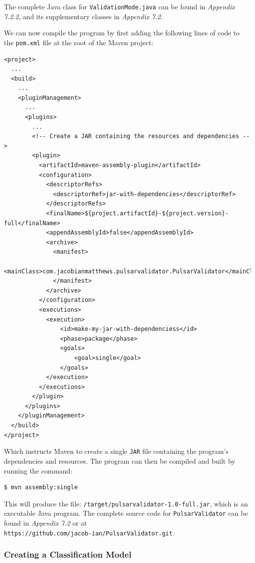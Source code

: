 \documentclass{article}
\begin{document}
The complete Java class for \verb|ValidationMode.java| can be found in \emph{Appendix 7.2.2}, and its supplementary classes in \emph{Appendix 7.2}.

We can now compile the program by first adding the following lines of code to the \verb|pom.xml| file at the root of the Maven project:

\begin{lstlisting}[numbers=none, title=pom.xml]
<project>
  ...
  <build>
    ...
    <pluginManagement>
      ...
      <plugins>
        ...
        <!-- Create a JAR containing the resources and dependencies -->
        <plugin>
          <artifactId>maven-assembly-plugin</artifactId>
          <configuration>
            <descriptorRefs>
              <descriptorRef>jar-with-dependencies</descriptorRef>
            </descriptorRefs>
            <finalName>${project.artifactId}-${project.version}-full</finalName>
            <appendAssemblyId>false</appendAssemblyId>
            <archive>
              <manifest>
                <mainClass>com.jacobianmatthews.pulsarvalidator.PulsarValidator</mainClass>
              </manifest>
            </archive>
          </configuration>
          <executions>
            <execution>
                <id>make-my-jar-with-dependenciess</id>
                <phase>package</phase>
                <goals>
                    <goal>single</goal>
                </goals>
            </execution>
          </executions>
        </plugin>
      </plugins>
    </pluginManagement>
  </build>
</project>
\end{lstlisting}

Which instructs Maven to create a single \verb|JAR| file containing the program's dependencies and resources. The program can then be compiled and built by running the command:

\begin{lstlisting}[numbers=none]
$ mvn assembly:single
\end{lstlisting}

This will produce the file: \verb|/target/pulsarvalidator-1.0-full.jar|, which is an executable Java program. The complete source code for \verb|PulsarValidator| can be found in \emph{Appendix 7.2} or at \\\verb|https://github.com/jacob-ian/PulsarValidator.git|.

\subsubsection{Creating a Classification Model}
\end{document}
